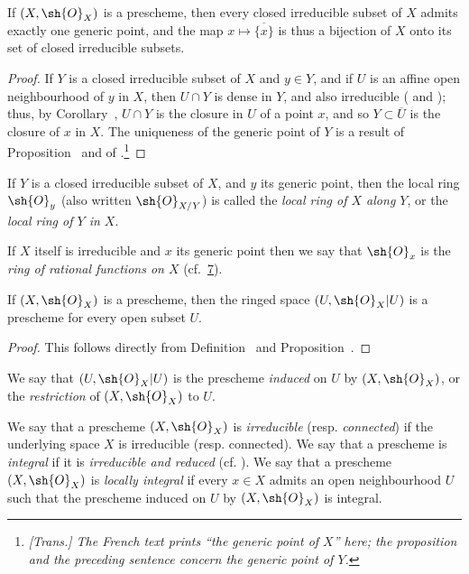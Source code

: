 \begin{proposition}[2.1.5]
\label{I.2.1.5}
If $(X,\sh{O}_X)$ is a prescheme, then every closed irreducible subset of $X$ admits exactly one generic point, and the map $x\mapsto\overline{\{x\}}$ is thus a bijection of $X$ onto its set of closed irreducible subsets.
\end{proposition}

\begin{proof}
If $Y$ is a closed irreducible subset of $X$ and $y\in Y$, and if $U$ is an affine open neighbourhood of $y$ in $X$, then $U\cap Y$ is dense in $Y$, and also irreducible ( and );
thus, by Corollary~, $U\cap Y$ is the closure in $U$ of a point $x$, and so $Y\subset\overline{U}$ is the closure of $x$ in $X$.
The uniqueness of the generic point of $Y$ is a result of Proposition~ and of .\footnote{\emph{[Trans.] The French text prints ``the generic point of $X$'' here; the proposition and the preceding sentence concern the generic point of $Y$.}}
\end{proof}

\begin{env}[2.1.6]
\label{I.2.1.6}
If $Y$ is a closed irreducible subset of $X$, and $y$ its generic point, then the local ring $\sh{O}_y$ (also written $\sh{O}_{X/Y}$) is called the \emph{local ring of $X$ along $Y$}, or the \emph{local ring of $Y$ in $X$}.

If $X$ itself is irreducible and $x$ its generic point then we say that $\sh{O}_x$ is the \emph{ring of rational functions on $X$} (cf.~\textsection\hyperref[section:I.7]{7}).
\end{env}

\begin{proposition}[2.1.7]
\label{I.2.1.7}
If $(X,\sh{O}_X)$ is a prescheme, then the ringed space $(U,\sh{O}_X|U)$ is a prescheme for every open subset $U$.
\end{proposition}

\begin{proof}
This follows directly from Definition~ and Proposition~.
\end{proof}

We say that $(U,\sh{O}_X|U)$ is the prescheme \emph{induced} on $U$ by $(X,\sh{O}_X)$, or the \emph{restriction} of $(X,\sh{O}_X)$ to $U$.

\begin{env}[2.1.8]
\label{I.2.1.8}
We say that a prescheme $(X,\sh{O}_X)$ is \emph{irreducible} (resp. \emph{connected}) if the underlying space $X$ is irreducible (resp. connected).
We say that a prescheme is \emph{integral} if it is \emph{irreducible and reduced} (cf. ).
We say that a prescheme $(X,\sh{O}_X)$ is \emph{locally integral} if every $x\in X$ admits an open neighbourhood $U$ such that the prescheme induced on $U$ by $(X,\sh{O}_X)$ is integral.
\end{env}

